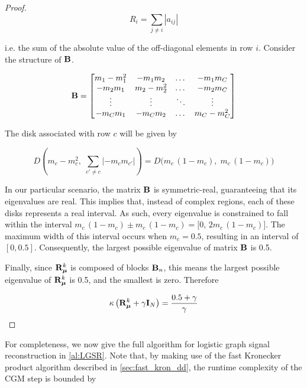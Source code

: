 \begin{proof}
    \begin{equation*}
        R_i = \sum_{j \neq i} |a_{ij}|
    \end{equation*}
    
    i.e. the sum of the absolute value of the off-diagonal elements in row $i$. Consider the structure of $\mathbf{B}$. 

    \begin{equation*}
        \mathbf{B} = \begin{bmatrix}
            m_1 - m_1^2 & -m_1 m_2 & \dots & - m_1 m_C \\
            - m_2 m_1 & m_2 - m_2^2 & \dots & -m_2 m_C \\
            \vdots & \vdots & \ddots & \vdots \\
            -m_C m_1 & -m_C m_2 & \dots &m_C- m_C^2
        \end{bmatrix}
    \end{equation*}
    
    The disk associated with row $c$ will be given by

    $$
    D\left(m_c - m_c^2, \; \sum_{c' \neq c} |-m_c m_{c'}|\right) = D\Big(m_c\,(1 - m_c), \; m_c\,(1 - m_c)\Big)
    $$
    
    In our particular scenario, the matrix $\mathbf{B}$ is symmetric-real, guaranteeing that its eigenvalues are real. This implies that, instead of complex regions, each of these disks represents a real interval. As such, every eigenvalue is constrained to fall within the interval $m_c\,(1 - m_c) \pm m_c\,(1 - m_c) = \big[0, \, 2 m_c\,(1 - m_c)\big]$. The maximum width of this interval occurs when $m_c = 0.5$, resulting in an interval of $[0, 0.5]$. Consequently, the largest possible eigenvalue of matrix $\mathbf{B}$ is 0.5.

    Finally, since $\mathbf{R}_{\boldsymbol{\mu}}^k$ is composed of blocks $\mathbf{B}_n$, this means the largest possible eigenvalue of $\mathbf{R}_{\boldsymbol{\mu}}^k$ is 0.5, and the smallest is zero. Therefore

    \begin{equation*}
        \kappa\left( \mathbf{R}_{\boldsymbol{\mu}}^k + \gamma \mathbf{I}_N\right) = \frac{0.5 + \gamma}{\gamma}
    \end{equation*}

\end{proof}

For completeness, we now give the full algorithm for logistic graph signal reconstruction in \cref{al:LGSR}. Note that, by making use of the fast Kronecker product algorithm described in \cref{sec:fast_kron_dd}, the runtime complexity of the CGM step is bounded by 

